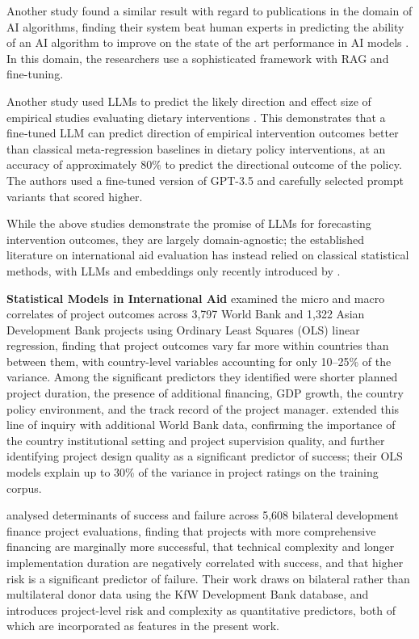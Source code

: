 \documentclass[12pt,a4paper]{article}
\let\citep\parencite
\begin{document}
Another study found a similar result with regard to publications in the domain of AI algorithms, finding their system beat human experts in predicting the ability of an AI algorithm to improve on the state of the art performance in AI models \citep{wenPredictingEmpiricalAI2025}. In this domain, the researchers use a sophisticated framework with RAG and fine-tuning.

Another study used LLMs to predict the likely direction and effect size of empirical studies evaluating dietary interventions \citep{kaiserLeveragingLLMsPredictive2025}. This demonstrates that a fine‑tuned LLM can predict direction of empirical intervention outcomes better than classical meta‑regression baselines in dietary policy interventions, at an accuracy of approximately 80\% to predict the directional outcome of the policy. The authors used a fine-tuned version of GPT-3.5 and carefully selected prompt variants that scored higher. 

While the above studies demonstrate the promise of LLMs for forecasting intervention outcomes, they are largely domain-agnostic; the established literature on international aid evaluation has instead relied on classical statistical methods, with LLMs and embeddings only recently introduced by \citep{goldembergMindingGapAid2025}.

\textbf{Statistical Models in International Aid} 
\citep{bulmanGoodCountriesGood2017} examined the micro and macro correlates of project outcomes across 3,797 World Bank and 1,322 Asian Development Bank projects using Ordinary Least Squares (OLS) linear regression, finding that project outcomes vary far more within countries than between them, with country-level variables accounting for only 10--25\% of the variance. Among the significant predictors they identified were shorter planned project duration, the presence of additional financing, GDP growth, the country policy environment, and the track record of the project manager. \citep{ashtonPuzzleMissingPieces2023} extended this line of inquiry with additional World Bank data, confirming the importance of the country institutional setting and project supervision quality, and further identifying project design quality as a significant predictor of success; their OLS models explain up to 30\% of the variance in project ratings on the training corpus.

\citep{eilersVolumeRiskComplexitya} analysed determinants of success and failure across 5,608 bilateral development finance project evaluations, finding that projects with more comprehensive financing are marginally more successful, that technical complexity and longer implementation duration are negatively correlated with success, and that higher risk is a significant predictor of failure. Their work draws on bilateral rather than multilateral donor data using the KfW Development Bank database, and introduces project-level risk and complexity as quantitative predictors, both of which are incorporated as features in the present work.
\end{document}
